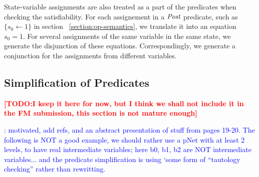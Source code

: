 \documentclass{lncs/llncs}
\newcommand{\TODO}[1]{\textcolor{red}{\textbf{[TODO:#1]}}}
\newcommand{\ERIC}[1]{\textcolor{blue}{#1}}
\newcommand{\OTvar}{\texttt}
\newcommand{\OTland}{\;\land\ }
\newcommand{\Post}{\symb{Post}}
\begin{document}
State-variable assignments are also treated as a part of the
predicates when checking the satisfiability. %
For each assignement in a $\Post$ predicate, such as $\{s_0 \leftarrow 1\}$ in section
~\ref{section:op-semantics}, we translate it into an equation
$s_0=1$. For several assignments of the same variable in the same state,
we generate the disjunction of 
these equations. Correspondingly, we generate a conjunction for the
assignments from different variables. 







\subsection{Simplification of Predicates}
\TODO{I keep it here for now, but I think we shall not include it in
  the FM submission, this section is not mature enough}

\ERIC{: motivated, add refs, and an abstract presentation of stuff
  from pages 19-20. The following is NOT a good example, we should
  rather use a pNet with at least 2 levels, to have real intermediate
variables; here b0, b1, b2 are NOT intermediate variables... and the
predicate simplification is using `some form of ``tautology checking''
rather than rewritting.}
\end{document}
